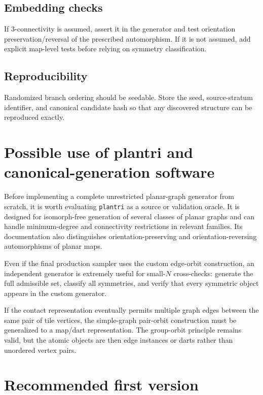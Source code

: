 \documentclass[11pt]{article}
\begin{document}
\subsection{Embedding checks}

If 3-connectivity is assumed, assert it in the generator and test orientation preservation/reversal of the prescribed automorphism. If it is not assumed, add explicit map-level tests before relying on symmetry classification.

\subsection{Reproducibility}

Randomized branch ordering should be seedable. Store the seed, source-stratum identifier, and canonical candidate hash so that any discovered structure can be reproduced exactly.

\section{Possible use of plantri and canonical-generation software}

Before implementing a complete unrestricted planar-graph generator from scratch, it is worth evaluating \texttt{plantri} as a source or validation oracle. It is designed for isomorph-free generation of several classes of planar graphs and can handle minimum-degree and connectivity restrictions in relevant families. Its documentation also distinguishes orientation-preserving and orientation-reversing automorphisms of planar maps.

Even if the final production sampler uses the custom edge-orbit construction, an independent generator is extremely useful for small-\(N\) cross-checks: generate the full admissible set, classify all symmetries, and verify that every symmetric object appears in the custom generator.

If the contact representation eventually permits multiple graph edges between the same pair of tile vertices, the simple-graph pair-orbit construction must be generalized to a map/dart representation. The group-orbit principle remains valid, but the atomic objects are then edge instances or darts rather than unordered vertex pairs.

\section{Recommended first version}
\end{document}
